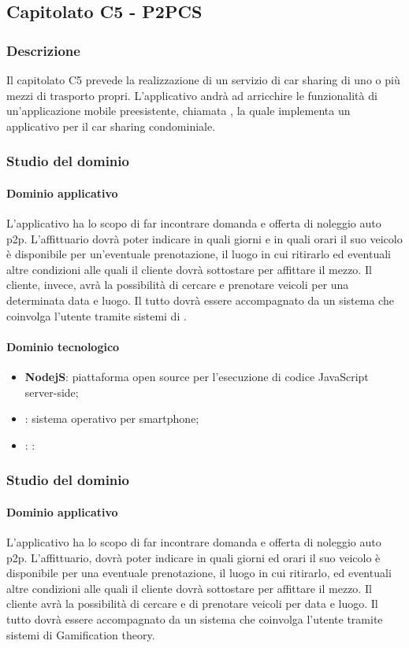 	\subsection{Capitolato C5 - P2PCS}
		\subsubsection{Descrizione}
		Il capitolato C5 prevede la realizzazione di un servizio di car sharing  di uno o più mezzi di trasporto propri. L'applicativo andrà ad arricchire le funzionalità di un'applicazione mobile preesistente, chiamata , la quale implementa un applicativo per il car sharing condominiale.
		\subsubsection{Studio del dominio}
			\paragraph{Dominio applicativo}
			L'applicativo ha lo scopo di far incontrare domanda e offerta di noleggio auto p2p. L'affittuario dovrà poter indicare in quali giorni e in quali orari il suo veicolo è disponibile per un'eventuale prenotazione, il luogo in cui ritirarlo ed eventuali altre condizioni alle quali il cliente dovrà sottostare per affittare il mezzo. Il cliente, invece, avrà la possibilità di cercare e prenotare veicoli per una determinata data e luogo. Il tutto dovrà essere accompagnato da un sistema che coinvolga l'utente tramite sistemi di .
			\paragraph{Dominio tecnologico} 
				\begin{itemize}
					\item  \textbf{NodejS}: piattaforma open source per l'esecuzione di codice JavaScript server-side;
					\item \textbf{}: sistema operativo per smartphone;
					\item \textbf{}: :
				\end{itemize}

		\subsubsection{Studio del dominio}
			\paragraph{Dominio applicativo} \Spazio
			L'applicativo ha lo scopo di far incontrare domanda e offerta di noleggio auto p2p.
L'affittuario, dovrà poter indicare in quali giorni ed orari il suo veicolo è disponibile
per una eventuale prenotazione, il luogo in cui ritirarlo, ed eventuali altre
condizioni alle quali il cliente dovrà sottostare per affittare il mezzo.
Il cliente avrà la possibilità di cercare e di prenotare veicoli per data e luogo.
Il tutto dovrà essere accompagnato da un sistema che coinvolga l'utente tramite sistemi di Gamification theory.
			
